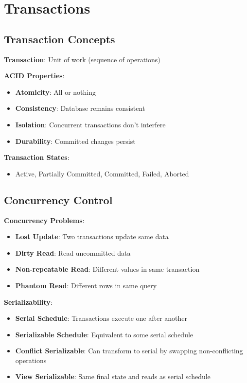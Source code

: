 \documentclass[12pt,a4paper]{report}
\begin{document}
\section{Transactions}

\subsection{Transaction Concepts}
\begin{concept}
\textbf{Transaction}: Unit of work (sequence of operations)

\textbf{ACID Properties}:
\begin{itemize}
    \item \textbf{Atomicity}: All or nothing
    \item \textbf{Consistency}: Database remains consistent
    \item \textbf{Isolation}: Concurrent transactions don't interfere
    \item \textbf{Durability}: Committed changes persist
\end{itemize}

\textbf{Transaction States}:
\begin{itemize}
    \item Active, Partially Committed, Committed, Failed, Aborted
\end{itemize}
\end{concept}

\subsection{Concurrency Control}
\begin{concept}
\textbf{Concurrency Problems}:
\begin{itemize}
    \item \textbf{Lost Update}: Two transactions update same data
    \item \textbf{Dirty Read}: Read uncommitted data
    \item \textbf{Non-repeatable Read}: Different values in same transaction
    \item \textbf{Phantom Read}: Different rows in same query
\end{itemize}

\textbf{Serializability}:
\begin{itemize}
    \item \textbf{Serial Schedule}: Transactions execute one after another
    \item \textbf{Serializable Schedule}: Equivalent to some serial schedule
    \item \textbf{Conflict Serializable}: Can transform to serial by swapping non-conflicting operations
    \item \textbf{View Serializable}: Same final state and reads as serial schedule
\end{itemize}
\end{concept}
\end{document}
